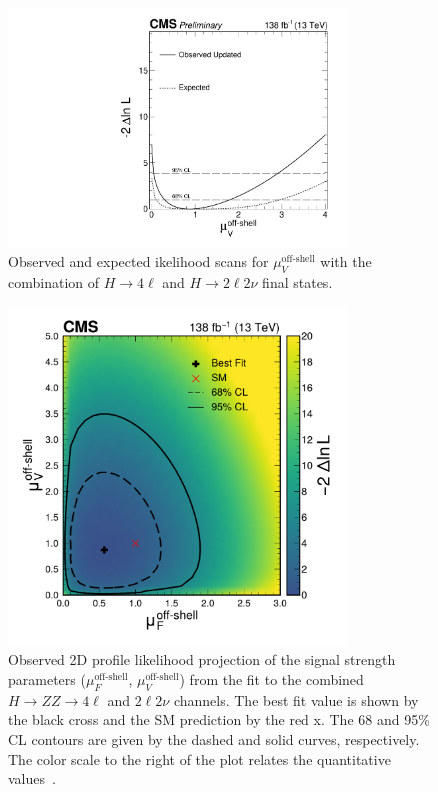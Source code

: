 \begin{figure}[!hbt]
\begin{center}
\includegraphics[width=0.8\textwidth]{figures/scan_muVoff_upd.pdf}
\caption
{
Observed and expected ikelihood scans for $\mu_V^{\text{off-shell}}$ with the combination of $H\to4\ell$ and $H\to2\ell2\nu$ final states.
\label{fig:1Dmus_V}
}
\end{center}
\end{figure}

\begin{figure}[!hbt]
  \centering
  \includegraphics[width=0.8\textwidth]{figures/Figure_012.pdf}  
  \caption
      {
        Observed 2D profile likelihood projection of the \offshell signal strength parameters ($\mu^\text{off-shell}_{F}$, $\mu^\text{off-shell}_{V}$) 
        from the fit to the combined \offshell $H\to ZZ\to4\ell$ and $2\ell2\nu$ channels. The best fit value is shown by the black cross and the SM 
        prediction by the red x. The 68 and 95\% CL contours are given by the dashed and solid curves, respectively. The color scale to the right of the plot relates the quantitative values~\cite{PhysRevD.111.092014}.
      }
    \label{fig:muoffshell} 
\end{figure}

